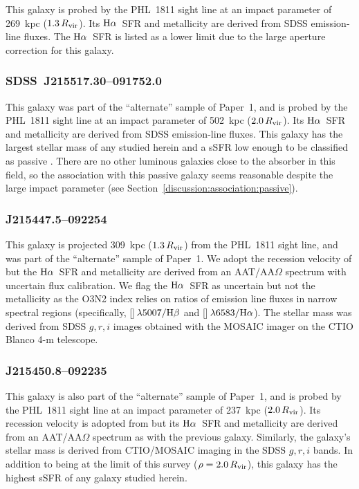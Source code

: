 \documentclass[twocolumn,twocolappendix,tighten,times]{aastex6}
\newcommand{\NII}{\ion{N}{2}}
\newcommand{\OIII}{\ion{O}{3}}
\newcommand{\Ha}{\ensuremath{{\rm H}\alpha}}
\newcommand{\Hb}{\ensuremath{{\rm H}\beta}}
\begin{document}
This galaxy is probed by the PHL~1811 sight line at an impact parameter of 
269~kpc ($1.3\,R_{\rm vir}$). Its \Ha\ SFR and metallicity are derived from 
SDSS emission-line fluxes. The \Ha\ SFR is listed as a lower limit due to the 
large aperture correction for this galaxy.


\subsubsection{SDSS~J215517.30--091752.0}
\label{indiv:galaxies:sdssj2155-09}

This galaxy was part of the ``alternate'' sample of Paper~1, and is probed by the 
PHL~1811 sight line at an impact parameter of 502~kpc ($2.0\,R_{\rm vir}$). 
Its \Ha\ SFR and metallicity are derived from SDSS emission-line fluxes. This 
galaxy has the largest stellar mass of any studied herein and a sSFR low enough 
to be classified as passive \citep{tumlinson11}. There are no other luminous 
galaxies close to the absorber in this field, so the association with this 
passive galaxy seems reasonable despite the large impact parameter (see 
Section~\ref{discussion:association:passive}).


\subsubsection{J215447.5--092254}
\label{indiv:galaxies:j2154-09a}

This galaxy is projected 309~kpc ($1.3\,R_{\rm vir}$) from the PHL~1811 sight 
line, and was part of the ``alternate'' sample of Paper~1. We adopt the recession 
velocity of \citet{prochaska11b} but the \Ha\ SFR and metallicity are derived 
from an AAT/AA$\Omega$ spectrum with uncertain flux calibration.  
We flag the \Ha\ SFR as uncertain but not the metallicity as the O3N2 index 
relies on ratios of emission line fluxes in narrow spectral regions (specifically, 
[\OIII]$\,\lambda5007/\Hb$ and [\NII]$\,\lambda6583/\Ha$).
The stellar mass was derived from SDSS $g,r,i$ images obtained with 
the MOSAIC imager on the CTIO Blanco 4-m telescope.


\subsubsection{J215450.8--092235}
\label{indiv:galaxies:j2154-09b}

This galaxy is also part of the ``alternate'' sample of Paper~1, and is 
probed by the PHL~1811 sight line at an impact parameter of 237~kpc 
($2.0\,R_{\rm vir}$). Its recession velocity is adopted from 
\citet{prochaska11b} but its \Ha\ SFR and metallicity are derived from 
an AAT/AA$\Omega$ spectrum as with the previous galaxy. Similarly, the 
galaxy's stellar mass is derived from CTIO/MOSAIC imaging in the 
SDSS $g,r,i$ bands. In addition to being at the limit of this survey 
($\rho=2.0\,R_{\rm vir}$), this galaxy has the highest sSFR of any galaxy 
studied herein.
\end{document}
